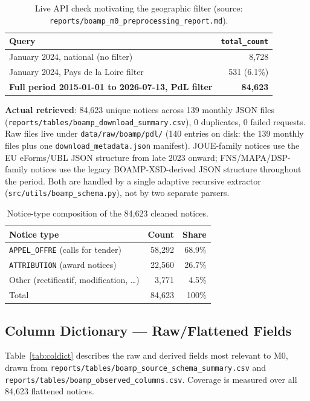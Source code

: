 \documentclass[11pt]{article}
\begin{document}
\begin{table}[h!]
\centering
\caption{Live API check motivating the geographic filter (source:
\texttt{reports/boamp\_m0\_preprocessing\_report.md}).}
\begin{tabular}{lr}
\toprule
Query & \texttt{total\_count} \\
\midrule
January 2024, national (no filter) & 8{,}728 \\
January 2024, Pays de la Loire filter & 531 (6.1\%) \\
\textbf{Full period 2015-01-01 to 2026-07-13, PdL filter} & \textbf{84{,}623} \\
\bottomrule
\end{tabular}
\end{table}

\textbf{Actual retrieved}: 84{,}623 unique notices across 139 monthly JSON
files (\texttt{reports/tables/boamp\_download\_summary.csv}), 0 duplicates,
0 failed requests. Raw files live under \texttt{data/raw/boamp/pdl/} (140
entries on disk: the 139 monthly files plus one \texttt{download\_metadata.json}
manifest). JOUE-family notices use the EU eForms/UBL JSON structure from
late 2023 onward; FNS/MAPA/DSP-family notices use the legacy BOAMP-XSD-derived
JSON structure throughout the period. Both are handled by a single adaptive
recursive extractor (\texttt{src/utils/boamp\_schema.py}), not by two
separate parsers.

\begin{table}[h!]
\centering
\caption{Notice-type composition of the 84{,}623 cleaned notices.}
\begin{tabular}{lrr}
\toprule
Notice type & Count & Share \\
\midrule
\texttt{APPEL\_OFFRE} (calls for tender) & 58{,}292 & 68.9\% \\
\texttt{ATTRIBUTION} (award notices) & 22{,}560 & 26.7\% \\
Other (rectificatif, modification, \ldots) & 3{,}771 & 4.5\% \\
\midrule
Total & 84{,}623 & 100\% \\
\bottomrule
\end{tabular}
\end{table}

\subsection{Column Dictionary --- Raw/Flattened Fields}
Table~\ref{tab:coldict} describes the raw and derived fields most relevant
to M0, drawn from \texttt{reports/tables/boamp\_source\_schema\_summary.csv}
and \texttt{reports/tables/boamp\_observed\_columns.csv}. Coverage is
measured over all 84{,}623 flattened notices.
\end{document}
